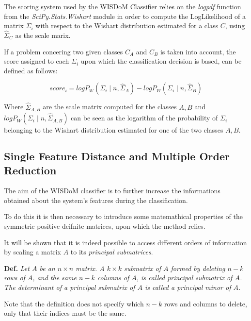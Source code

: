 \documentclass[12pt,openright,twoside,a4paper]{book}
\begin{document}
The scoring system used by the WISDoM Classifier relies on the \textit{logpdf} function from the \textit{SciPy.Stats.Wishart} module in order to compute the LogLikelihood of a matrix $\Sigma_i$ with respect to the Wishart distribution estimated for a class $C$, using $\hat{\Sigma}_C$ as the scale marix.

If a problem concering two given classes $C_A$ and $C_B$ is taken into account, the score assigned to each $\Sigma_i$ upon which the classification decision is based, can be defined as follows:

\begin{equation}
score_{i}= logP_{W}(\Sigma_{i}\mid n, \hat{\Sigma}_{A})-logP_{W}(\Sigma_{i}\mid n,\hat{\Sigma}_{B})
\label{pdf-score}
\end{equation}

Where $\hat{\Sigma}_{A,B}$ are the scale matrix computed for the classes $A,B$ and $ logP_{W}(\Sigma_{i}\mid n, \hat{\Sigma}_{A,B})$ can be seen as the logarithm of the probability of $\Sigma_i$ belonging to the Wishart distribution estimated for one of the two classes $A,B$.

\subsection{Single Feature Distance and Multiple Order Reduction}

The aim of the WISDoM classifier is to further increase the informations obtained about the system's features during the classification.

To do this it is then necessary to introduce some matemathical properties of the symmetric positive deifnite matrices, upon which the method relies.

It will be shown that it is indeed possible to access different orders of information by scaling a matrix $A$ to its \textit{principal submatrices}.

\vspace{5mm}

\textbf{Def.} \textit{Let $A$ be an $n \times n$ matrix. A $k \times k$ submatrix of $A$ formed by deleting $n-k$ rows of $A$, and the same $n-k$ columns of $A$, is called principal submatrix of $A$. The determinant of a principal submatrix of $A$ is called a principal minor of $A$.}

\vspace{5mm}

Note that the definition does not specify which $n-k$ rows and columns to delete, only that their indices must be the same.
\end{document}
